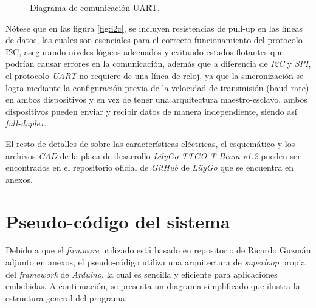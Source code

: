 \documentclass[journal]{IEEEtran}
\begin{document}
\begin{figure}[h!]
    \centering
    \caption{Diagrama de comunicación UART.}
    \label{fig:uart-tx-rx}
\end{figure}

Nótese que en las figura \ref{fig:i2c}, se incluyen resistencias de pull-up en las líneas de datos, las cuales son esenciales para el correcto funcionamiento del protocolo I2C, asegurando niveles lógicos adecuados y evitando estados flotantes que podrían causar errores en la comunicación, además que a diferencia de \textit{I2C} y \textit{SPI}, el protocolo \textit{UART} no requiere de una línea de reloj, ya que la sincronización se logra mediante la configuración previa de la velocidad de transmisión (baud rate) en ambos dispositivos y en vez de tener una arquitectura maestro-esclavo, ambos dispositivos pueden enviar y recibir datos de manera independiente, siendo así \textit{full-duplex}.

El resto de detalles de sobre las características eléctricas, el esquemático y los archivos \textit{CAD} de la placa de desarrollo \textit{LilyGo TTGO T-Beam v1.2} pueden ser encontrados en el repositorio oficial de \textit{GitHub} de \textit{LilyGo} que se encuentra en anexos.

\section{Pseudo-código del sistema}

Debido a que el \textit{firmware} utilizado está basado en repositorio de Ricardo Guzmán adjunto en anexos, el pseudo-código utiliza una arquitectura de \textit{superloop} propia del \textit{framework} de \textit{Arduino}, la cual es sencilla y eficiente para aplicaciones embebidas. A continuación, se presenta un diagrama simplificado que ilustra la estructura general del programa:
\end{document}
